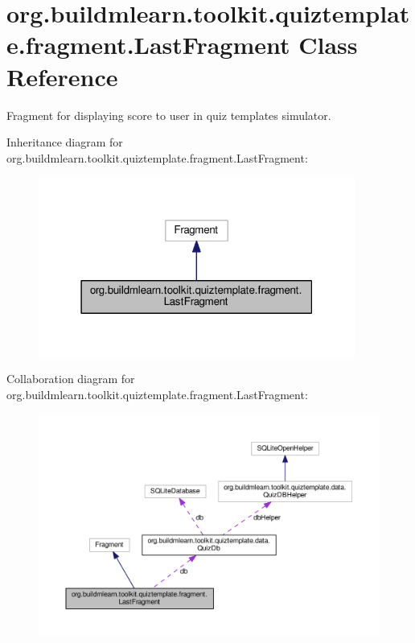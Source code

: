 \hypertarget{classorg_1_1buildmlearn_1_1toolkit_1_1quiztemplate_1_1fragment_1_1LastFragment}{}\section{org.\+buildmlearn.\+toolkit.\+quiztemplate.\+fragment.\+Last\+Fragment Class Reference}
\label{classorg_1_1buildmlearn_1_1toolkit_1_1quiztemplate_1_1fragment_1_1LastFragment}


Fragment for displaying score to user in quiz template\textquotesingle{}s simulator.  




Inheritance diagram for org.\+buildmlearn.\+toolkit.\+quiztemplate.\+fragment.\+Last\+Fragment\+:
\nopagebreak
\begin{figure}[H]
\begin{center}
\leavevmode
\includegraphics[width=295pt]{classorg_1_1buildmlearn_1_1toolkit_1_1quiztemplate_1_1fragment_1_1LastFragment__inherit__graph}
\end{center}
\end{figure}


Collaboration diagram for org.\+buildmlearn.\+toolkit.\+quiztemplate.\+fragment.\+Last\+Fragment\+:
\nopagebreak
\begin{figure}[H]
\begin{center}
\leavevmode
\includegraphics[width=350pt]{classorg_1_1buildmlearn_1_1toolkit_1_1quiztemplate_1_1fragment_1_1LastFragment__coll__graph}
\end{center}
\end{figure}
